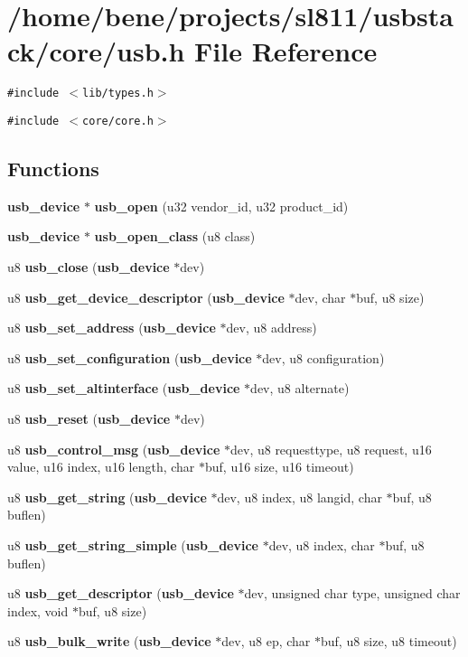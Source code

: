 \section{/home/bene/projects/sl811/usbstack/core/usb.h File Reference}
\label{usb_8h}
{\tt \#include $<$lib/types.h$>$}\par
{\tt \#include $<$core/core.h$>$}\par
\subsection*{Functions}
\begin{CompactItemize}
\item 
{\bf usb\_\-device} $\ast$ {\bf usb\_\-open} (u32 vendor\_\-id, u32 product\_\-id)
\item 
{\bf usb\_\-device} $\ast$ {\bf usb\_\-open\_\-class} (u8 class)
\item 
u8 {\bf usb\_\-close} ({\bf usb\_\-device} $\ast$dev)
\item 
u8 {\bf usb\_\-get\_\-device\_\-descriptor} ({\bf usb\_\-device} $\ast$dev, char $\ast$buf, u8 size)
\item 
u8 {\bf usb\_\-set\_\-address} ({\bf usb\_\-device} $\ast$dev, u8 address)
\item 
u8 {\bf usb\_\-set\_\-configuration} ({\bf usb\_\-device} $\ast$dev, u8 configuration)
\item 
u8 {\bf usb\_\-set\_\-altinterface} ({\bf usb\_\-device} $\ast$dev, u8 alternate)
\item 
u8 {\bf usb\_\-reset} ({\bf usb\_\-device} $\ast$dev)
\item 
u8 {\bf usb\_\-control\_\-msg} ({\bf usb\_\-device} $\ast$dev, u8 requesttype, u8 request, u16 value, u16 index, u16 length, char $\ast$buf, u16 size, u16 timeout)
\item 
u8 {\bf usb\_\-get\_\-string} ({\bf usb\_\-device} $\ast$dev, u8 index, u8 langid, char $\ast$buf, u8 buflen)
\item 
u8 {\bf usb\_\-get\_\-string\_\-simple} ({\bf usb\_\-device} $\ast$dev, u8 index, char $\ast$buf, u8 buflen)
\item 
u8 {\bf usb\_\-get\_\-descriptor} ({\bf usb\_\-device} $\ast$dev, unsigned char type, unsigned char index, void $\ast$buf, u8 size)
\item 
u8 {\bf usb\_\-bulk\_\-write} ({\bf usb\_\-device} $\ast$dev, u8 ep, char $\ast$buf, u8 size, u8 timeout)
\item 

\end{CompactItemize}
